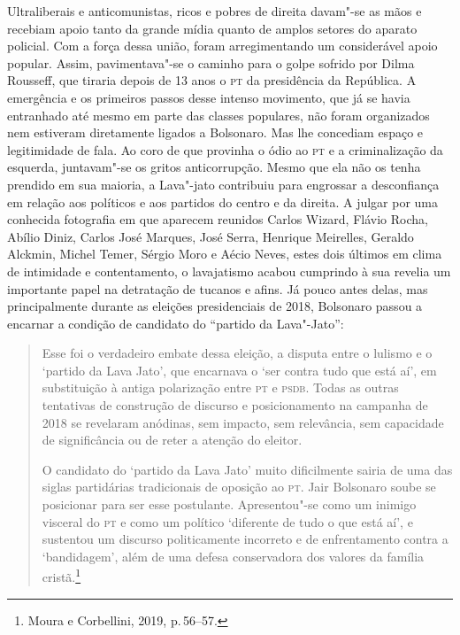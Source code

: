 Ultraliberais e anticomunistas, ricos e pobres de direita davam"-se as
mãos e recebiam apoio tanto da grande mídia quanto de amplos setores do
aparato policial. Com a força dessa união, foram arregimentando um
considerável apoio popular. Assim, pavimentava"-se o caminho para o golpe
sofrido por Dilma Rousseff, que tiraria depois de 13 anos o \textsc{pt} da
presidência da República. A emergência e os primeiros passos desse
intenso movimento, que já se havia entranhado até mesmo em parte das
classes populares, não foram organizados nem estiveram diretamente
ligados a Bolsonaro. Mas lhe concediam espaço e legitimidade de fala. Ao
coro de que provinha o ódio ao \textsc{pt} e a criminalização da esquerda,
juntavam"-se os gritos anticorrupção. Mesmo que ela não os tenha prendido
em sua maioria, a Lava"-jato contribuiu para engrossar a desconfiança em
relação aos políticos e aos partidos do centro e da direita. A julgar
por uma conhecida fotografia em que aparecem reunidos Carlos Wizard,
Flávio Rocha, Abílio Diniz, Carlos José Marques, José Serra, Henrique
Meirelles, Geraldo Alckmin, Michel Temer, Sérgio Moro e Aécio Neves,
estes dois últimos em clima de intimidade e contentamento, o lavajatismo
acabou cumprindo à sua revelia um importante papel na detratação de
tucanos e afins. Já pouco antes delas, mas principalmente durante as
eleições presidenciais de 2018, Bolsonaro passou a encarnar a condição
de candidato do ``partido da Lava"-Jato'':

\begin{quote}
Esse foi o verdadeiro embate dessa eleição, a disputa entre o lulismo e
o `partido da Lava Jato', que encarnava o `ser contra tudo que está aí',
em substituição à antiga polarização entre \textsc{pt} e \textsc{psdb}. Todas as outras
tentativas de construção de discurso e posicionamento na campanha de
2018 se revelaram anódinas, sem impacto, sem relevância, sem capacidade
de significância ou de reter a atenção do eleitor.

O candidato do `partido da Lava Jato' muito dificilmente sairia de uma
das siglas partidárias tradicionais de oposição ao \textsc{pt}. Jair Bolsonaro
soube se posicionar para ser esse postulante. Apresentou"-se como um
inimigo visceral do \textsc{pt} e como um político `diferente de tudo o que está
aí', e sustentou um discurso politicamente incorreto e de enfrentamento
contra a `bandidagem', além de uma defesa conservadora dos valores da
família cristã.\footnote{Moura e Corbellini, 2019, p.\,56--57.}
\end{quote}

